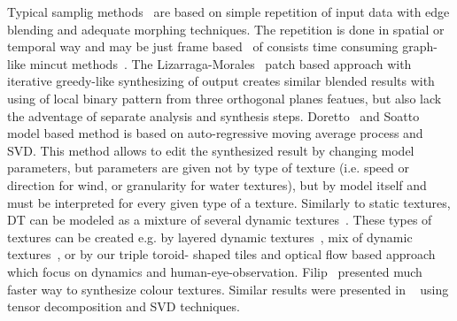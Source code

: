 \documentclass{\adsty/acmsiggraph}
\begin{document}
Typical samplig methods~\cite{Schodl00videotextures,Kwatra03graphcuttextures,Phillips03} are based on simple repetition of input data with edge blending and adequate morphing techniques. The repetition is done in spatial or temporal way and may be just frame based~\cite{Schodl00videotextures} of consists time consuming graph-like mincut methods~\cite{Kwatra03graphcuttextures}.
The  Lizarraga-Morales~\cite{Lizarraga-Morales14} patch based approach with iterative greedy-like synthesizing of output creates similar blended results with using of local binary pattern from three orthogonal planes featues, but also lack the adventage of separate analysis and synthesis steps. 
Doretto~\cite{Dyn_tex_jourmal_dorettoCWS03ijcv} and Soatto~\cite{Dyn_tex_soatto01} model based method is based on  auto-regressive moving average process and SVD. This method allows to edit the synthesized result by changing model parameters, but parameters are given not by type of texture (i.e. speed or direction for wind, or granularity for water textures), but by model itself and must be interpreted for every given type of a texture.
 Similarly to static  textures, DT can be modeled  as a mixture of several dynamic textures~\cite{Chan08modelingclustering,ChanV05:0}. These types of textures can be created e.g. by layered dynamic textures~\cite{Chan06layereddynamic}, mix of dynamic
  textures~\cite{Bar-joseph01texturemixing,ChanV05:0,Chan08modelingclustering}, or by our triple toroid- shaped tiles and optical flow based approach which focus on dynamics and human-eye-observation.
 Filip~\cite{Filip06FastSynthesis} presented much faster way to synthesize colour textures. Similar results were  presented in ~\cite{ChanV05:0,DynTexSynConstantini,Costantini08higherorder} using tensor decomposition and SVD techniques. 
\end{document}
